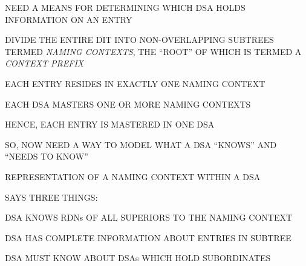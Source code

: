 \begin{bwslide}

\begin{nrtc}
\item	NEED A MEANS FOR DETERMINING WHICH DSA HOLDS INFORMATION ON AN ENTRY

\item	DIVIDE THE ENTIRE DIT INTO NON-OVERLAPPING SUBTREES
	TERMED \emph{NAMING CONTEXTS},
	THE ``ROOT'' OF WHICH IS TERMED A \emph{CONTEXT PREFIX}

\item	EACH ENTRY RESIDES IN EXACTLY ONE NAMING CONTEXT
\end{nrtc}
\end{bwslide}




\begin{bwslide}

\begin{nrtc}
\item	EACH DSA MASTERS ONE OR MORE NAMING CONTEXTS

\item	HENCE, EACH ENTRY IS MASTERED IN ONE DSA

\item	SO, NOW NEED A WAY TO MODEL WHAT A DSA ``KNOWS'' AND ``NEEDS TO KNOW''
\end{nrtc}
\end{bwslide}


\begin{bwslide}

\begin{nrtc}
\item	REPRESENTATION OF A NAMING CONTEXT WITHIN A DSA

\item	SAYS THREE THINGS:
    \begin{nrtc}
    \item	DSA KNOWS RDNs OF ALL SUPERIORS TO THE NAMING CONTEXT

    \item	DSA HAS COMPLETE INFORMATION ABOUT ENTRIES IN SUBTREE

    \item	DSA MUST KNOW ABOUT DSAs WHICH HOLD SUBORDINATES
    \end{nrtc}
\end{nrtc}
\end{bwslide}


